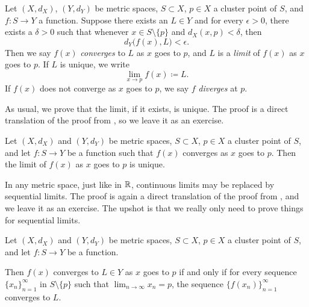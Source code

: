 \begin{defn}
%
Let $(X,d_X)$, $(Y,d_Y)$ be metric spaces, $S \subset X$, $p \in X$ a cluster point of $S$,
and $f \colon S \to Y$ a function.
Suppose there exists an $L \in Y$ and for every $\epsilon > 0$,
there exists a $\delta > 0$ such that whenever $x \in S \setminus \{ p \}$
and $d_X(x,p) < \delta$, then
\begin{equation*}
d_Y\bigl(f(x),L\bigr) < \epsilon .
\end{equation*}
Then we say $f(x)$
\emph{converges} to $L$ as $x$ goes
to $p$, and $L$ is a \emph{limit} of $f(x)$ as $x$
goes to $p$.  If $L$ is unique, we write
\begin{equation*}
\lim_{x \to p} f(x) \coloneqq L .
\end{equation*}
If $f(x)$ does not converge as $x$ goes to $p$, we say $f$
\emph{diverges} at $p$.
\end{defn}

As usual, we prove that the limit, if it exists, is unique.
The proof is a direct translation of the proof
from , so we leave it as an exercise.

\begin{prop} \label{prop:mslimitisunique}
Let $(X,d_X)$ and $(Y,d_Y)$ be metric spaces, $S \subset X$, $p \in X$
a cluster point of $S$, and let $f \colon S \to Y$ be a function
such that $f(x)$ converges as $x$ goes to $p$.  Then
the limit of $f(x)$ as $x$ goes to $p$ is unique.
\end{prop}

In any metric space, just like in ${\mathbb{R}}$, continuous limits may be
replaced by sequential limits.  The proof is again a direct translation
of the proof from , and we leave it as an
exercise.  The upshot is that we really only need to prove things for
sequential limits.

\begin{lemma}\label{ms:seqflimit:lemma}
Let $(X,d_X)$ and $(Y,d_Y)$ be metric spaces, $S \subset X$, $p \in X$
a cluster point of $S$, and let $f \colon S \to Y$ be a function.

Then
$f(x)$ converges to $L \in Y$ as $x$ goes to $p$ if and only if for every
sequence $\{ x_n \}_{n=1}^\infty$
in $S \setminus \{p\}$
such that $\lim_{n\to\infty} x_n = p$,
the sequence $\bigl\{ f(x_n) \bigr\}_{n=1}^\infty$ converges to $L$.
\end{lemma}

